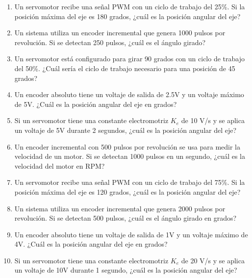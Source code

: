 \documentclass[../main]{subfiles}
\begin{document}
\begin{enumerate}
    \item Un servomotor recibe una señal PWM con un ciclo de trabajo del 25\%. Si la posición máxima del eje es 180 grados, ¿cuál es la posición angular del eje?
    \item Un sistema utiliza un encoder incremental que genera 1000 pulsos por revolución. Si se detectan 250 pulsos, ¿cuál es el ángulo girado?
    \item Un servomotor está configurado para girar 90 grados con un ciclo de trabajo del 50\%. ¿Cuál sería el ciclo de trabajo necesario para una posición de 45 grados?
    \item Un encoder absoluto tiene un voltaje de salida de 2.5V y un voltaje máximo de 5V. ¿Cuál es la posición angular del eje en grados?
    \item Si un servomotor tiene una constante electromotriz \(K_e\) de 10 V/s y se aplica un voltaje de 5V durante 2 segundos, ¿cuál es la posición angular del eje?
    \item Un encoder incremental con 500 pulsos por revolución se usa para medir la velocidad de un motor. Si se detectan 1000 pulsos en un segundo, ¿cuál es la velocidad del motor en RPM?
    \item Un servomotor recibe una señal PWM con un ciclo de trabajo del 75\%. Si la posición máxima del eje es 120 grados, ¿cuál es la posición angular del eje?
    \item Un sistema utiliza un encoder incremental que genera 2000 pulsos por revolución. Si se detectan 500 pulsos, ¿cuál es el ángulo girado en grados?
    \item Un encoder absoluto tiene un voltaje de salida de 1V y un voltaje máximo de 4V. ¿Cuál es la posición angular del eje en grados?
    \item Si un servomotor tiene una constante electromotriz \(K_e\) de 20 V/s y se aplica un voltaje de 10V durante 1 segundo, ¿cuál es la posición angular del eje?
\end{enumerate}
\end{document}
